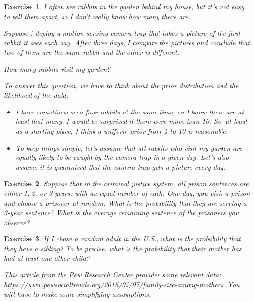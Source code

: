 \documentclass[12pt]{book}
\theoremstyle{exercise}
\newtheorem{exercise}{Exercise}[chapter]
\begin{document}
\begin{exercise}
I often see rabbits in the garden behind my house, but it's not easy to tell them apart, so I don't really know how many there are.

Suppose I deploy a motion-sensing camera trap that takes a picture of the first rabbit it sees each day.  After three days, I compare the pictures and conclude that two of them are the same rabbit and the other is different.

How many rabbits visit my garden?

To answer this question, we have to think about the prior distribution and the likelihood of the data:

\begin{itemize}

\item I have sometimes seen four rabbits at the same time, so I know there are at least that many.  I would be surprised if there were more than 10.  So, at least as a starting place, I think a uniform prior from 4 to 10 is reasonable.

\item To keep things simple, let's assume that all rabbits who visit my garden are equally likely to be caught by the camera trap in a given day.  Let's also assume it is guaranteed that the camera trap gets a picture every day.

\end{itemize}

\end{exercise}

\begin{exercise}
Suppose that in the criminal justice system, all prison sentences are either 1, 2, or 3 years, with an equal number of each.  One day, you visit a prison and choose a prisoner at random.  What is the probability that they are serving a 3-year sentence?  What is the average remaining sentence of the prisoners you observe?
\end{exercise}


\begin{exercise}
If I chose a random adult in the U.S., what is the probability that they have a sibling? To be precise, what is the probability that their mother has had at least one other child?

This article from the Pew Research Center provides some relevant data: \url{https://www.pewsocialtrends.org/2015/05/07/family-size-among-mothers}.  You will have to make some simplifying assumptions.
\end{exercise}
\end{document}
